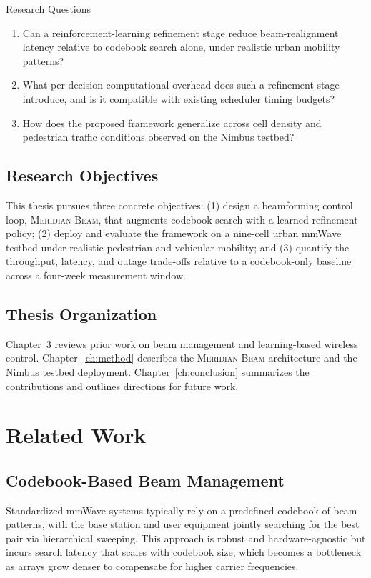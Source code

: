 \documentclass[12pt,a4paper]{report}
\begin{document}
\begin{kubox}{Research Questions}
\begin{enumerate}[label=\textbf{RQ\arabic*.}, leftmargin=2.1cm]
  \item Can a reinforcement-learning refinement stage reduce beam-realignment
        latency relative to codebook search alone, under realistic urban
        mobility patterns?
  \item What per-decision computational overhead does such a refinement stage
        introduce, and is it compatible with existing scheduler timing
        budgets?
  \item How does the proposed framework generalize across cell density and
        pedestrian traffic conditions observed on the Nimbus testbed?
\end{enumerate}
\end{kubox}

\section{Research Objectives}
This thesis pursues three concrete objectives: (1) design a beamforming
control loop, \textsc{Meridian-Beam}, that augments codebook search with a
learned refinement policy; (2) deploy and evaluate the framework on a
nine-cell urban mmWave testbed under realistic pedestrian and vehicular
mobility; and (3) quantify the throughput, latency, and outage trade-offs
relative to a codebook-only baseline across a four-week measurement window.

\section{Thesis Organization}
Chapter~\ref{ch:related} reviews prior work on beam management and
learning-based wireless control. Chapter~\ref{ch:method} describes the
\textsc{Meridian-Beam} architecture and the Nimbus testbed deployment.
Chapter~\ref{ch:conclusion} summarizes the contributions and outlines
directions for future work.

\chapter{Related Work}
\label{ch:related}

\section{Codebook-Based Beam Management}
Standardized mmWave systems typically rely on a predefined codebook of beam
patterns, with the base station and user equipment jointly searching for the
best pair via hierarchical sweeping. This approach is robust and
hardware-agnostic but incurs search latency that scales with codebook size,
which becomes a bottleneck as arrays grow denser to compensate for higher
carrier frequencies.
\end{document}
